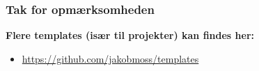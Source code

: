 \documentclass[handout]{beamer}
\newcommand\mygithub{\url{https://github.com/jakobmoss/templates}}
\begin{document}
\begin{frame}
  \frametitle{Tak for opmærksomheden}

  \textbf{Flere templates (især til projekter) kan findes her:}
  \begin{itemize}
  \item \mygithub{}
  \end{itemize}

\end{frame}








\end{document}
